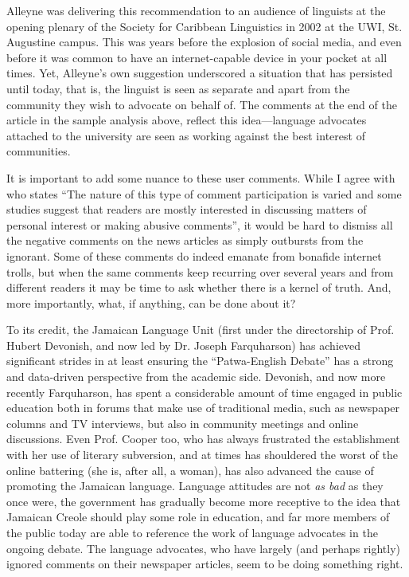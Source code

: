 \documentclass[output=paper,colorlinks,citecolor=brown]{langscibook}
\begin{document}
Alleyne was delivering this recommendation to an audience of linguists at the opening plenary of the Society for Caribbean Linguistics in 2002 at the UWI, St. Augustine campus. This was years before the explosion of social media, and even before it was common to have an internet-capable device in your pocket at all times. Yet, Alleyne’s own suggestion underscored a situation that has persisted until today, that is, the linguist is seen as separate and apart from the community they wish to advocate on behalf of. The comments at the end of the article in the sample analysis above, reflect this idea—language advocates attached to the university are seen as working against the best interest of communities.  

It is important to add some nuance to these user comments. While I agree with \citet[605]{Canter2013} who states “The nature of this type of comment participation is varied and some studies suggest that readers are mostly interested in discussing matters of personal interest or making abusive comments”, it would be hard to dismiss all the negative comments on the news articles as simply outbursts from the ignorant. Some of these comments do indeed emanate from bonafide internet trolls, but when the same comments keep recurring over several years and from different readers it may be time to ask whether there is a kernel of truth. And, more importantly, what, if anything, can be done about it? 

To its credit, the Jamaican Language Unit (first under the directorship of Prof. Hubert Devonish, and now led by Dr. Joseph Farquharson) has achieved significant strides in at least ensuring the “Patwa-English Debate” has a strong and data-driven perspective from the academic side. Devonish, and now more recently Farquharson, has spent a considerable amount of time engaged in public education both in forums that make use of traditional media, such as newspaper columns and TV interviews, but also in community meetings and online discussions. Even Prof. Cooper too, who has always frustrated the establishment with her use of literary subversion, and at times has shouldered the worst of the online battering (she is, after all, a woman), has also advanced the cause of promoting the Jamaican language. Language attitudes are not \emph{as bad} as they once were, the government has gradually become more receptive to the idea that Jamaican Creole should play some role in education, and far more members of the public today are able to reference the work of language advocates in the ongoing debate. The language advocates, who have largely (and perhaps rightly) ignored comments on their newspaper articles, seem to be doing something right. 
\end{document}
